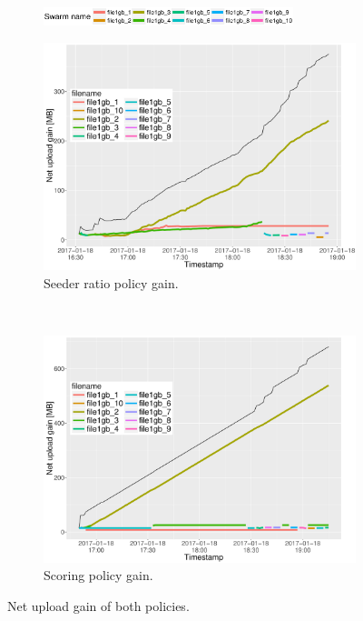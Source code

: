\begin{figure}[h!]
	\begin{adjustwidth}{-1.5cm}{}
		\begin{subfigure}[t]{1.2\textwidth}
			\centering
			\includegraphics[width=0.8\textwidth]{pics/results/legends.eps}
		\end{subfigure}
		\begin{subfigure}[t]{0.6\textwidth}
			\vspace{-0.5cm}
			\centering
			\includegraphics[width=\textwidth]{pics/results/simple1_sr_notrig.pdf}
			\caption{Seeder ratio policy gain.}
			\label{fig:simplesrnotrig}
		\end{subfigure}
		~
		\begin{subfigure}[t]{0.6\textwidth}
			\vspace{-0.5cm}
			\centering
			\includegraphics[width=\textwidth]{pics/results/simple1_scsr_notrig.pdf}
			\caption{Scoring policy gain.}
			\label{fig:simplescsrnotrig}
		\end{subfigure}
		\caption{Net upload gain of both policies.}
	\end{adjustwidth}
\end{figure} 

